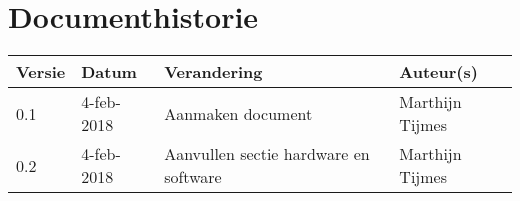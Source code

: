\section{Documenthistorie}

\begin{tabularx}{\textwidth}{| l | l | X | l |}
    \hline
    \textbf{Versie} & \textbf{Datum} & \textbf{Verandering} & \textbf{Auteur(s)}
    \\ \hline
    0.1	& 4-feb-2018 & Aanmaken document & Marthijn Tijmes \\ \hline
    0.2 & 4-feb-2018 & Aanvullen sectie hardware en software & Marthijn Tijmes \\ \hline

\end{tabularx}
